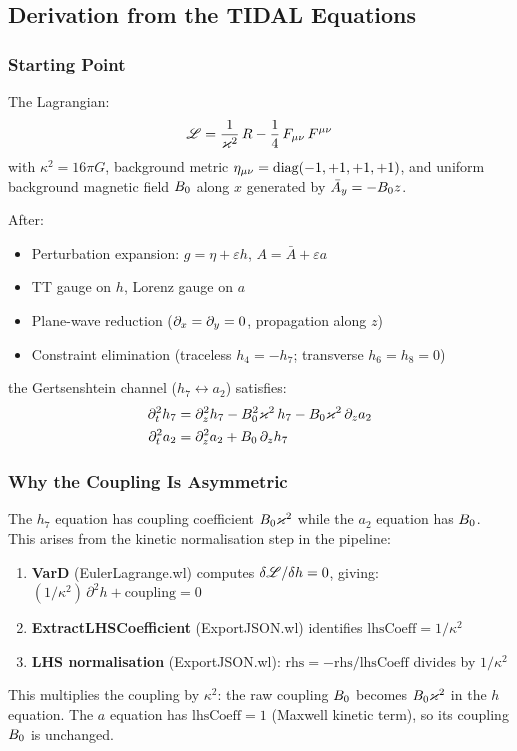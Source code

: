 \subsection{Derivation from the TIDAL Equations}

\subsubsection{Starting Point}

The Lagrangian:
\begin{equation}
  \mathscr{L} = \frac{1}{\varkappa^2}\, R - \frac{1}{4}\, F_{\mu\nu}\, F^{\mu\nu}
  \label{eq:lagrangian}
\end{equation}
with $\kappa^2 = 16\pi G$, background metric $\eta_{\mu\nu} = \text{diag}(-1,+1,+1,+1)$, and uniform background magnetic field $B_0$ along $x$ generated by $\bar{A}_y = -B_0 z$.

After:
\begin{itemize}
  \item Perturbation expansion: $g = \eta + \varepsilon h$, $A = \bar{A} + \varepsilon a$
  \item TT gauge on $h$, Lorenz gauge on $a$
  \item Plane-wave reduction ($\partial_x = \partial_y = 0$, propagation along $z$)
  \item Constraint elimination (traceless $h_4 = -h_7$; transverse $h_6 = h_8 = 0$)
\end{itemize}
the Gertsenshtein channel ($h_7 \leftrightarrow a_2$) satisfies:
\begin{align}
  \partial_t^2 h_7 &= \partial_z^2 h_7 - B_0^2 \varkappa^2\, h_7 - B_0 \varkappa^2\, \partial_z a_2 \label{eq:eom-h7} \\
  \partial_t^2 a_2 &= \partial_z^2 a_2 + B_0\, \partial_z h_7 \label{eq:eom-a2}
\end{align}

\subsubsection{Why the Coupling Is Asymmetric}

The $h_7$ equation has coupling coefficient $B_0\varkappa^2$ while the $a_2$ equation has $B_0$. This arises from the kinetic normalisation step in the pipeline:
\begin{enumerate}
  \item \textbf{VarD} (EulerLagrange.wl) computes $\delta\mathscr{L}/\delta h = 0$, giving: $(1/\kappa^2)\,\partial^2 h + \text{coupling} = 0$
  \item \textbf{ExtractLHSCoefficient} (ExportJSON.wl) identifies $\text{lhsCoeff} = 1/\kappa^2$
  \item \textbf{LHS normalisation} (ExportJSON.wl): $\text{rhs} = -\text{rhs}/\text{lhsCoeff}$ divides by $1/\kappa^2$
\end{enumerate}
This multiplies the coupling by $\kappa^2$: the raw coupling $B_0$ becomes $B_0\varkappa^2$ in the $h$ equation. The $a$ equation has $\text{lhsCoeff} = 1$ (Maxwell kinetic term), so its coupling $B_0$ is unchanged.


